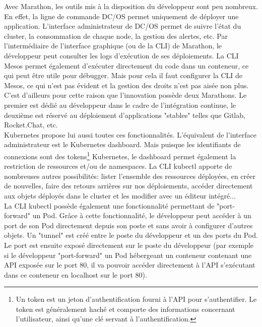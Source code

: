 \documentclass[11pt,fleqn]{book} %
\begin{document}
Avec Marathon, les outils mis à la disposition du développeur sont peu nombreux. En effet, la ligne de commande DC/OS permet uniquement de déployer une application. L'interface administrateur de DC/OS permet de suivre l'état du cluster, la consommation de chaque node, la gestion des alertes, etc. Par l'intermédiaire de l'interface graphique (ou de la CLI) de Marathon, le développeur peut consulter les logs d'exécution de ses déploiements. La CLI Mesos permet également d'exécuter directement du code dans un conteneur, ce qui peut être utile pour débugger. Mais pour cela il faut configurer la CLI de Mesos, ce qui n'est pas évident et la gestion des droits n'est pas aisée non plus. C'est d'ailleurs pour cette raison que l'innovation possède deux Marathons. Le premier est dédié au développeur dans le cadre de l'intégration continue, le deuxième est réservé au déploiement d'applications "stables" telles que Gitlab, Rocket.Chat, etc. \\

Kubernetes propose lui aussi toutes ces fonctionnalités. L'équivalent de l'interface administrateur est le Kubernetes dashboard. Mais puisque les identifiants de connexions sont des tokens\footnote{Un token est un jeton d'authentification fourni à l'API pour s'authentifier. Le token est généralement haché et comporte des informations concernant l'utilisateur, ainsi qu'une clé servant à l'authentification.} Kubernetes, le dashboard permet également la restriction de ressources et/ou de namespaces. La CLI kubectl apporte de nombreuses autres possibilités: lister l'ensemble des ressources déployées, en créer de nouvelles, faire des retours arrières sur nos déploiements, accéder directement aux objets déployés dans le cluster et les modifier avec un éditeur intégré...\\ 

La CLI kubectl possède également une fonctionnalité permettant de "port-forward" un Pod. Grâce à cette fonctionnalité, le développeur peut accéder à un port de son Pod directement depuis son poste et sans avoir à configurer d'autres objets. Un "tunnel" est créé entre le poste du développeur et un des ports du Pod. Le port est ensuite exposé directement sur le poste du développeur (par exemple si le développeur "port-forward" un Pod hébergeant un conteneur contenant une API exposée sur le port 80, il va pouvoir accéder directement à l'API s'exécutant dans ce conteneur en localhost sur le port 80). \\
\end{document}
